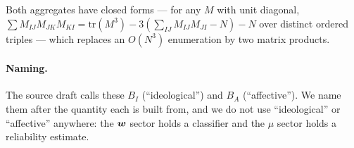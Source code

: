 Both aggregates have closed forms --- for any $M$ with unit diagonal,
$\sum \! M_{IJ}M_{JK}M_{KI} = \mathrm{tr}(M^3) - 3(\sum_{IJ} M_{IJ}M_{JI} - N) - N$
over distinct ordered triples --- which replaces an $O(N^3)$ enumeration by two
matrix products.

\paragraph{Naming.} The source draft calls these $B_I$ (``ideological'') and $B_A$
(``affective''). We name them after the quantity each is built from, and we do not
use ``ideological'' or ``affective'' anywhere: the $\bm{w}$ sector holds a
classifier and the $\mu$ sector holds a reliability estimate.
